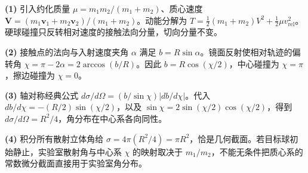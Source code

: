 \par\noindent\textbf{(1)} 引入约化质量 \(\mu=m_1m_2/(m_1+m_2)\)、质心速度 \(\boldsymbol V=(m_1\boldsymbol v_1+m_2\boldsymbol v_2)/(m_1+m_2)\)。动能分解为 \(T=\tfrac12(m_1+m_2)V^2+\tfrac12\mu v_{\mathrm{rel}}^2\)。硬球碰撞只反转相对速度的接触法向分量，切向分量不变。
\par\noindent\textbf{(2)} 接触点的法向与入射速度夹角 \(\alpha\) 满足 \(b=R\sin\alpha\)。镜面反射使相对轨迹的偏转角 \(\chi=\pi-2\alpha=2\arccos(b/R)\)。因此 \(b=R\cos(\chi/2)\)，中心碰撞为 \(\chi=\pi\)，擦边碰撞为 \(\chi=0\)。
\par\noindent\textbf{(3)} 轴对称经典公式 \(d\sigma/d\Omega=(b/\sin\chi)|db/d\chi|\)。代入 \(db/d\chi=-(R/2)\sin(\chi/2)\)，以及 \(\sin\chi=2\sin(\chi/2)\cos(\chi/2)\)，得到 \(d\sigma/d\Omega=R^2/4\)，角分布在中心系各向同性。
\par\noindent\textbf{(4)} 积分所有散射立体角给 \(\sigma=4\pi(R^2/4)=\pi R^2\)，恰是几何截面。若目标球初始静止，实验室散射角与中心系 \(\chi\) 的映射取决于 \(m_1/m_2\)，不能无条件把质心系的常数微分截面直接用于实验室角分布。
